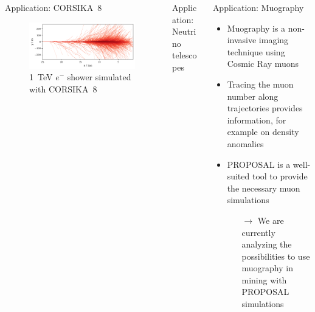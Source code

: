 \documentclass[t]{beamer}
\newlength{\thirdtextwidth}
\newlength{\itemseparation}
\begin{document}
\begin{columns}[onlytextwidth]
\begin{column}{\thirdtextwidth}
\begin{block}[equal height group=B]{Application: CORSIKA~8}
              \begin{figure}
                \centering
                \includegraphics[width=0.8\linewidth, height=.4\textheight, keepaspectratio]{plots/shower_horizonal.png}
                \caption*{\SI{1}{\tera\electronvolt} $e^-$ shower simulated with CORSIKA~8}
              \end{figure}
      \end{block}%
    \end{column}%
    \begin{column}{\thirdtextwidth}%
      \begin{block}[equal height group=B]{Application: Neutrino telescopes}%

      \end{block}
    \end{column}

    \begin{column}{\thirdtextwidth}%
      \begin{block}[equal height group=B]{Application: Muography}%
        \begin{itemize}
          \setlength\itemsep{\itemseparation}
          \item Muography is a non-invasive imaging technique using Cosmic Ray muons
          \item Tracing the muon number along trajectories provides information, for example on density anomalies
          \item PROPOSAL is a well-suited tool to provide the necessary muon simulations
          \begin{itemize}
            \setlength\itemsep{\itemseparation}
            \item[$\rightarrow$] We are currently analyzing the possibilities to use muography in mining with PROPOSAL simulations
          \end{itemize} 
        \end{itemize}
      \vspace{3em}
        \begin{figure}
            \begin{tikzpicture}[scale=2.5, every node/.style={scale=0.85}]
                \centering


\end{tikzpicture}
\end{figure}
\end{block}
\end{column}
\end{columns}
\end{document}
